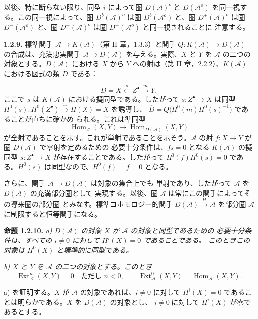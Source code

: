 \clearpage
{}%
\begingroup\small\setlength{\parskip}{0pt}\setlength{\emergencystretch}{1.5em}
\setlength{\abovedisplayskip}{4pt plus 2pt minus 2pt}%
\setlength{\belowdisplayskip}{4pt plus 2pt minus 2pt}%

以後、特に断らない限り、同型 $i$ によって圏 $D(\mathcal A)^o$ と
$D(\mathcal A^o)$ を同一視する。この同一視によって、圏
$D^b(\mathcal A)^o$ は圏 $D^b(\mathcal A^o)$ と、圏
$D^+(\mathcal A)^o$ は圏 $D^-(\mathcal A^o)$ と、圏
$D^-(\mathcal A)^o$ は圏 $D^+(\mathcal A^o)$ と同一視されることに
注意する。

\medskip\noindent\textbf{1.2.9.}\quad
標準関手 $\mathcal A\longrightarrow K(\mathcal A)$（第 II 章，1.3.3）と関手
$Q\colon K(\mathcal A)\longrightarrow D(\mathcal A)$ の合成は、充満忠実関手
$\mathcal A\longrightarrow D(\mathcal A)$ を与える。実際、$X$ と $Y$ を
$\mathcal A$ の二つの対象とする。$D(\mathcal A)$ における $X$ から $Y$
への射は（第 II 章，2.2.2）、$K(\mathcal A)$ における図式の類
$\overline D$ である：

\[
\overline D=X\xleftarrow{\ s\ }Z^\bullet\xrightarrow{\ m\ }Y,
\]
ここで $s$ は $K(\mathcal A)$ における擬同型である。したがって
$s\colon Z^\bullet\longrightarrow X$ は同型
$H^0(s)\colon H^0(Z^\bullet)\xrightarrow{\sim}H(X)=X$ を誘導し、
$\overline D=Q\bigl(H^0(m)H^0(s)^{-1}\bigr)$ であることが直ちに確かめ
られる。これは準同型
\[
\operatorname{Hom}_{\mathcal A}(X,Y)\longrightarrow
\operatorname{Hom}_{D(\mathcal A)}(X,Y)
\]
が全射であることを示す。これが単射であることを示そう。$\mathcal A$ の射
$f\colon X\longrightarrow Y$ が圏 $D(\mathcal A)$ で零射を定めるための
必要十分条件は、$fs=0$ となる $K(\mathcal A)$ の擬同型
$s\colon Z^\bullet\longrightarrow X$ が存在することである。したがって
$H^0(f)H^0(s)=0$ である。$H^0(s)$ は同型なので、$H^0(f)=f=0$ となる。

さらに、関手 $\mathcal A\longrightarrow D(\mathcal A)$ は対象の集合上でも
単射であり、したがって $\mathcal A$ を $D(\mathcal A)$ の充満部分圏として
実現する。以後、圏 $\mathcal A$ は常にこの関手によってその導来圏の部分圏
とみなす。標準コホモロジー的関手 $D(\mathcal A)\xrightarrow{H}\mathcal A$
を部分圏 $\mathcal A$ に制限すると恒等関手になる。

\medskip\noindent\textbf{命題 1.2.10.}\quad
\textit{a) $D(\mathcal A)$ の対象 $X$ が $\mathcal A$ の対象と同型であるための
必要十分条件は、すべての $i\neq0$ に対して $H^i(X)=0$ であることである。
このときこの対象は $H^0(X)$ と標準的に同型である。}

\noindent\textit{b) $X$ と $Y$ を $\mathcal A$ の二つの対象とする。このとき}
\[
\operatorname{Ext}_{\mathcal A}^{n}(X,Y)=0\quad\text{ただし }n<0,
\qquad
\operatorname{Ext}_{\mathcal A}^{0}(X,Y)
=\operatorname{Hom}_{\mathcal A}(X,Y).
\]

a) を証明する。$X$ が $\mathcal A$ の対象であれば、$i\neq0$ に対して
$H^i(X)=0$ であることは明らかである。$X$ を $D(\mathcal A)$ の対象とし、
$i\neq0$ に対して $H^i(X)$ が零であるとする。
\endgroup
